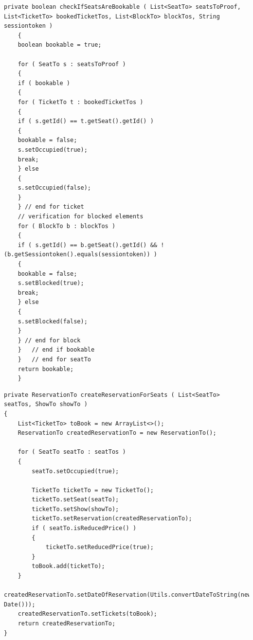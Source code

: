 \begin{minipage}{\linewidth}
	\begin{lstlisting}[style=lstJava]
	private boolean checkIfSeatsAreBookable ( List<SeatTo> seatsToProof, List<TicketTo> bookedTicketTos, List<BlockTo> blockTos, String sessiontoken )
	{
	boolean bookable = true;
	
	for ( SeatTo s : seatsToProof )
	{
	if ( bookable )
	{
	for ( TicketTo t : bookedTicketTos )
	{
	if ( s.getId() == t.getSeat().getId() )
	{
	bookable = false;
	s.setOccupied(true);
	break;
	} else
	{
	s.setOccupied(false);
	}
	} // end for ticket
	// verification for blocked elements
	for ( BlockTo b : blockTos )
	{
	if ( s.getId() == b.getSeat().getId() && !(b.getSessiontoken().equals(sessiontoken)) )
	{
	bookable = false;
	s.setBlocked(true);
	break;
	} else
	{
	s.setBlocked(false);
	}
	} // end for block
	}	// end if bookable
	}	// end for seatTo
	return bookable;
	}
	\end{lstlisting}
	\label{lst:Angang_Prüfung_ob_Reservierung_möglich}
\end{minipage}

\begin{minipage}{\linewidth}
\begin{lstlisting}[style=lstJava]
private ReservationTo createReservationForSeats ( List<SeatTo> seatTos, ShowTo showTo )
{
	List<TicketTo> toBook = new ArrayList<>();
	ReservationTo createdReservationTo = new ReservationTo();
		
	for ( SeatTo seatTo : seatTos )
	{
		seatTo.setOccupied(true);
	
		TicketTo ticketTo = new TicketTo();
		ticketTo.setSeat(seatTo);
		ticketTo.setShow(showTo);
		ticketTo.setReservation(createdReservationTo);
		if ( seatTo.isReducedPrice() )
		{
			ticketTo.setReducedPrice(true);
		}
		toBook.add(ticketTo);
	}
	createdReservationTo.setDateOfReservation(Utils.convertDateToString(new Date()));
	createdReservationTo.setTickets(toBook);
	return createdReservationTo;
}
	\end{lstlisting}
	\label{lst:Anhang_Erstellen_Reservierung}
\end{minipage}

